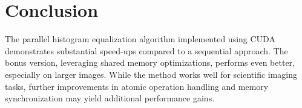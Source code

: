 \documentclass[9pt]{IEEEtran}
\begin{document}
\section{Conclusion}
The parallel histogram equalization algorithm implemented using CUDA demonstrates substantial speed-ups compared to a sequential approach. The bonus version, leveraging shared memory optimizations, performs even better, especially on larger images. While the method works well for scientific imaging tasks, further improvements in atomic operation handling and memory synchronization may yield additional performance gains.



\end{document}
